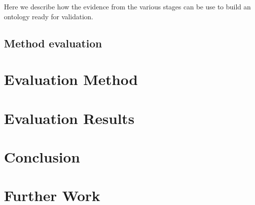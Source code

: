 \documentclass[a4paper]{report}
\begin{document}
Here we describe how the evidence from the various stages can be use to build an ontology ready for validation.

\section{Method evaluation}

\chapter{Evaluation Method}


\chapter{Evaluation Results}


\chapter{Conclusion}


\chapter{Further Work}


\nocite{*}


\clearpage



\end{document}
